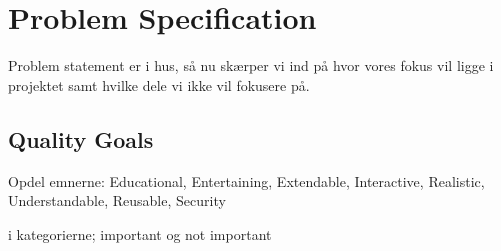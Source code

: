 \section{Problem Specification} \label{sec:problem-specification}

Problem statement er i hus, så nu skærper vi ind på hvor vores fokus vil ligge i projektet samt hvilke dele vi ikke vil fokusere på.




\subsection{Quality Goals} \label{sec:quality-goals}

Opdel emnerne:
Educational, Entertaining, Extendable, Interactive, Realistic, Understandable, Reusable, Security

i kategorierne; important og not important